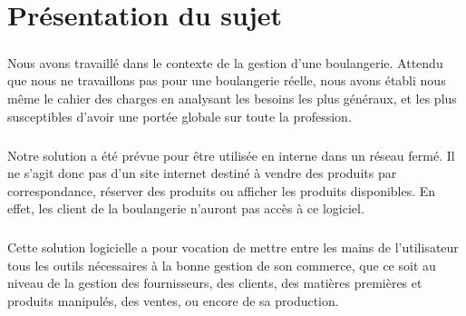 \chapter{Présentation du sujet}

\paragraph{}
    Nous avons travaillé dans le contexte de la gestion d'une boulangerie.
    Attendu que nous ne travaillons pas pour une boulangerie réelle, nous avons
    établi nous même le cahier des charges en analysant les besoins les plus
    généraux, et les plus susceptibles d'avoir une portée globale sur toute
    la profession.
\paragraph{}
    Notre solution a été prévue pour être utilisée en interne dans un réseau
    fermé. Il ne s'agit donc pas d'un site internet destiné à vendre des
    produits par correspondance, réserver des produits ou afficher les produits
    disponibles. En effet, les client de la boulangerie n'auront pas accès à ce
    logiciel.
\paragraph{}
    Cette solution logicielle a pour vocation de mettre entre les mains de 
    l'utilisateur tous les outils nécessaires à la bonne gestion de son
    commerce, que ce soit au niveau de la gestion des fournisseurs, des
    clients, des matières premières et produits manipulés, des ventes,
    ou encore de sa production.

